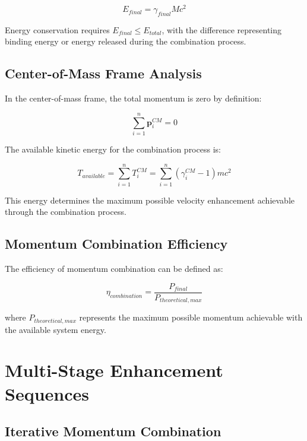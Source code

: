 \documentclass[11pt,a4paper]{article}
\theoremstyle{remark}
\begin{document}
\begin{equation}
E_{final} = \gamma_{final} M c^2
\label{eq:final_energy}
\end{equation}

Energy conservation requires $E_{final} \leq E_{total}$, with the difference representing binding energy or energy released during the combination process.

\subsection{Center-of-Mass Frame Analysis}

In the center-of-mass frame, the total momentum is zero by definition:

\begin{equation}
\sum_{i=1}^{n} \mathbf{p}_i^{CM} = 0
\label{eq:cm_momentum}
\end{equation}

The available kinetic energy for the combination process is:

\begin{equation}
T_{available} = \sum_{i=1}^{n} T_i^{CM} = \sum_{i=1}^{n} (\gamma_i^{CM} - 1) m c^2
\label{eq:available_energy}
\end{equation}

This energy determines the maximum possible velocity enhancement achievable through the combination process.

\subsection{Momentum Combination Efficiency}

The efficiency of momentum combination can be defined as:

\begin{equation}
\eta_{combination} = \frac{P_{final}}{P_{theoretical,max}}
\label{eq:combination_efficiency}
\end{equation}

where $P_{theoretical,max}$ represents the maximum possible momentum achievable with the available system energy.

\section{Multi-Stage Enhancement Sequences}

\subsection{Iterative Momentum Combination}
\end{document}
